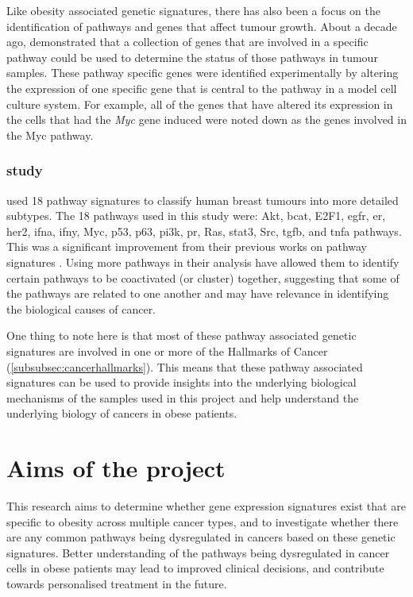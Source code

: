 Like obesity associated genetic signatures, there has also been a focus on the identification of pathways and genes that affect tumour growth.
About a decade ago, \citet{Bild2006} demonstrated that a collection of genes that are involved in a specific pathway could be used to determine the status of those pathways in tumour samples.
These pathway specific genes were identified experimentally by altering the expression of one specific gene that is central to the pathway in a model cell culture system.
For example, all of the genes that have altered its expression in the cells that had  the \textit{Myc} gene induced were noted down as the genes involved in the Myc pathway.

\subsubsection{\citet{Gatza2010a} study}
\label{ssub:gatza_study}

\citet{Gatza2010a} used 18 pathway signatures to classify human breast tumours into more detailed subtypes.
The 18 pathways used in this study were: Akt, \gls{bcat}, E2F1, \gls{egfr}, \gls{er}, \gls{her2}, \gls{ifna}, \gls{ifny}, Myc, p53, p63, \gls{pi3k}, \gls{pr}, Ras, \gls{stat3}, Src, \gls{tgfb}, and \gls{tnfa} pathways.
This was a significant improvement from their previous works on pathway signatures \citep{Bild2006,Bild2009}.
Using more pathways in their analysis have allowed them to identify certain pathways to be coactivated (or cluster) together, suggesting that some of the pathways are related to one another and may have relevance in identifying the biological causes of cancer.

One thing to note here is that most of these pathway associated genetic signatures are involved in one or more of the Hallmarks of Cancer (\cref{subsubsec:cancerhallmarks}).
This means that these pathway associated signatures can be used to provide insights into the underlying biological mechanisms of the samples used in this project and help understand the underlying biology of cancers in obese patients.

\section{Aims of the project}
\label{sec:aim}

This research aims to determine whether gene expression signatures exist  that are specific to obesity across multiple cancer types, and to investigate whether there are any common pathways being dysregulated in cancers based on these genetic signatures.
Better understanding of the pathways being dysregulated in cancer cells in obese patients may lead to improved clinical decisions, and contribute towards personalised treatment in the future.

